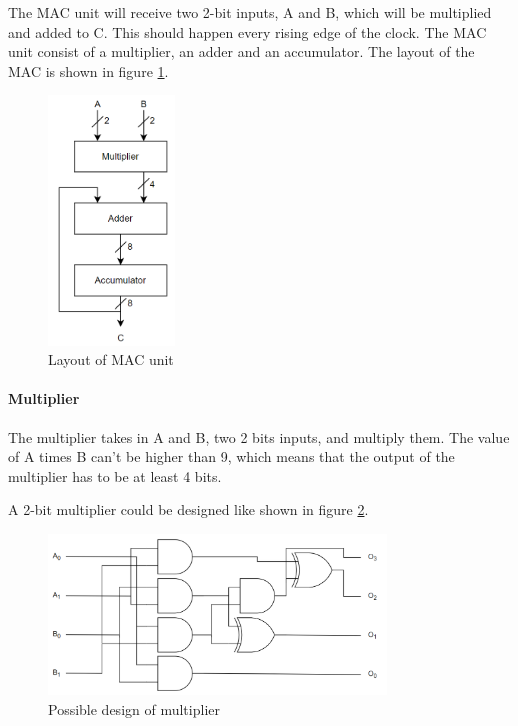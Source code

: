The MAC unit will receive two 2-bit inputs, A and B, which will be multiplied and added to C. This should happen every rising edge of the clock. The MAC unit consist of a multiplier, an adder and an accumulator. The layout of the MAC is shown in figure \ref{fig:mac-blokk}. 
\begin{figure}[htpb]
    \centering
    \includegraphics[width=0.3\textwidth]{Figures/mac-blokk.png}
    \caption{Layout of MAC unit}
    \label{fig:mac-blokk}
\end{figure}

\paragraph{Multiplier}
The multiplier takes in A and B, two 2 bits inputs, and multiply them. The value of A times B can't be higher than 9, which means that the output of the multiplier has to be at least 4 bits. 

A 2-bit multiplier could be designed like shown in figure \ref{fig:multiplier}.

\begin{figure}[H]
    \centering
    \includegraphics[width=0.8\textwidth]{Figures/multiplier.png}
    \caption{Possible design of multiplier}
    \label{fig:multiplier}
\end{figure}

